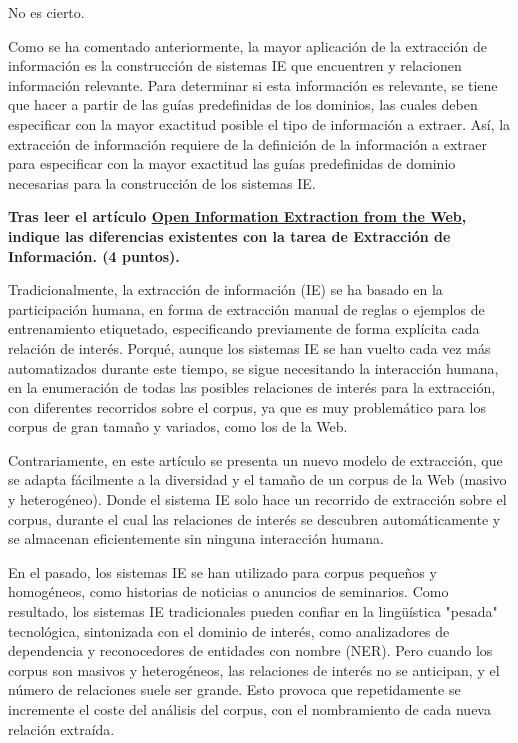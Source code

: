 \documentclass[11pt]{exam}
\begin{document}
\begin{questions}
No es cierto. 

Como se ha comentado anteriormente, la mayor aplicación de la extracción de información es la construcción de sistemas IE que encuentren y relacionen información relevante. Para determinar si esta información es relevante, se tiene que hacer a partir de las guías predefinidas de los dominios, las cuales deben especificar con la mayor exactitud posible el tipo de información a extraer. Así, la extracción de información requiere de la definición de la información a extraer para especificar con la mayor exactitud las guías predefinidas de dominio necesarias para la construcción de los sistemas IE.

{\bf \question Tras leer el artículo \href{https://www.aaai.org/Papers/IJCAI/2007/IJCAI07-429.pdf}{Open Information Extraction from the Web}, indique las diferencias existentes con la tarea de Extracción de Información. (4 puntos).}

Tradicionalmente, la extracción de información (IE) se ha basado en la participación humana, en forma de extracción manual de reglas o ejemplos de entrenamiento etiquetado, especificando previamente de forma explícita cada relación de interés. Porqué, aunque los sistemas IE se han vuelto cada vez más automatizados durante este tiempo, se sigue necesitando la interacción humana, en la enumeración de todas las posibles relaciones de interés para la extracción, con diferentes recorridos sobre el corpus, ya que es muy problemático para los corpus de gran tamaño y variados, como los de la Web. 

Contrariamente, en este artículo se presenta un nuevo modelo de extracción, que se adapta fácilmente a la diversidad y el tamaño de un corpus de la Web (masivo y heterogéneo). Donde el sistema IE solo hace un recorrido de extracción sobre el corpus, durante el cual las relaciones de interés se descubren automáticamente y se almacenan eficientemente sin ninguna interacción humana. 

En el pasado, los sistemas IE se han utilizado para corpus pequeños y homogéneos, como historias de noticias o anuncios de seminarios. Como resultado, los sistemas IE tradicionales pueden confiar en la lingüística "pesada" tecnológica, sintonizada con el dominio de interés, como analizadores de dependencia y reconocedores de entidades con nombre (NER). 
Pero cuando los corpus son masivos y heterogéneos, las relaciones de interés no se anticipan, y el número de relaciones suele ser grande. Esto provoca que repetidamente se incremente el coste del análisis del corpus, con el nombramiento de cada nueva relación extraída.


\end{questions}
\end{document}
